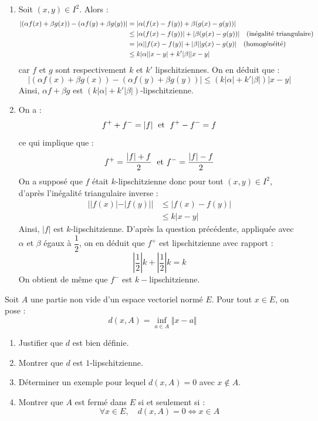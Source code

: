 \documentclass[a4paper,10pt]{report}
\begin{document}
\begin{enumerate}
\item Soit $(x,y) \in I^2$. Alors :
\begin{align*}
\vert (\alpha f(x)+ \beta g(x))-(\alpha f(y)+ \beta g(y)) \vert & = \vert \alpha (f(x)-f(y)) + \beta (g(x)-g(y)) \vert \\
& \leq \vert \alpha (f(x)-f(y)) \vert + \vert \beta (g(x)-g(y)) \vert \quad \hbox{(inégalité triangulaire)} \\
& = \vert \alpha \vert \vert f(x)-f(y) \vert + \vert \beta \vert \vert g(x)-g(y) \vert \quad \hbox{(homogénéité)} \\
& \leq k \vert \alpha \vert  \vert x-y \vert + k' \vert \beta \vert \vert x-y \vert 
\end{align*}
car $f$ et $g$ sont respectivement $k$ et $k'$ lipschitziennes. On en déduit que :
$$ \vert (\alpha f(x)+ \beta g(x))-(\alpha f(y)+ \beta g(y)) \vert \leq (k \vert \alpha \vert + k' \vert \beta \vert) \vert x-y \vert$$
Ainsi, $\alpha f+ \beta g$ est $(k \vert \alpha \vert + k' \vert \beta \vert)$-lipschitzienne.
\item On a :
$$ f^{+} + f^{-} = \vert f \vert \; \hbox{ et } \; f^{+}-f^{-} = f$$
ce qui implique que :
$$ f^{+} = \dfrac{\vert f \vert+f}{2} \; \hbox{ et } f^{-}=\dfrac{\vert f \vert - f}{2}$$
On a supposé que $f$ était $k$-lipschitzienne donc pour tout $(x,y) \in I^2$, d'après l'inégalité triangulaire \og inverse \fg :
\begin{align*}
\vert \vert f(x) \vert - \vert f(y) \vert \vert & \leq \vert f(x)-f(y) \vert  \\
& \leq k \vert x-y \vert
\end{align*}
Ainsi, $\vert f \vert$ est $k$-lipschitzienne. D'après la question précédente, appliquée avec $\alpha$ et $\beta$ égaux à $\dfrac{1}{2}$, on en déduit que $f^{+}$ est lipschitzienne avec rapport :
$$ \left\vert \dfrac{1}{2} \right\vert k + \left\vert \dfrac{1}{2} \right\vert k = k$$
On obtient de même que $f^{-}$ est $k-$lipschitzienne.
\end{enumerate}








\begin{Exa}[\ding{80}] Soit $A$ une partie non vide d'un espace vectoriel normé $E$. Pour tout $x \in E$, on pose :
$$d(x,A) = \inf_{a \in A} \Vert x- a \Vert$$

\begin{enumerate}
\item Justifier que $d$ est bien définie.
\item Montrer que $d$ est $1$-lipschitzienne.
\item Déterminer un exemple pour lequel $d(x,A)=0$ avec $x \notin A$.
\item Montrer que $A$ est fermé dans $E$ si et seulement si :
$$ \forall x \in E, \quad d(x,A)=0 \Longleftrightarrow x \in A $$
\end{enumerate}
\end{Exa}
\end{document}
